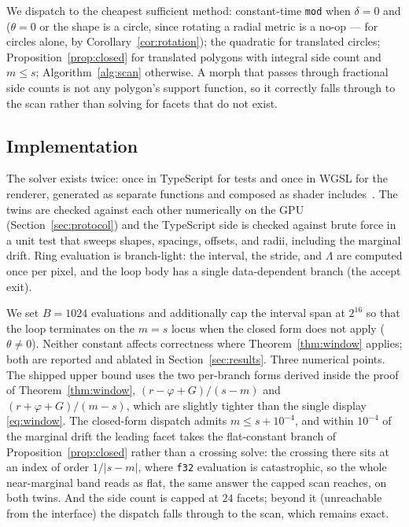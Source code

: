 We dispatch to the cheapest sufficient method: constant-time \texttt{mod} when
$\delta=0$ and ($\theta=0$ or the shape is a circle, since rotating a radial
metric is a no-op --- for circles alone, by
Corollary~\ref{cor:rotation}); the quadratic for translated circles; Proposition~\ref{prop:closed}
for translated polygons with integral side count and $m \le s$;
Algorithm~\ref{alg:scan} otherwise. A morph that passes through fractional side
counts is not any polygon's support function, so it correctly falls through to the
scan rather than solving for facets that do not exist.

\subsection{Implementation}
\label{sec:impl}

The solver exists twice: once in TypeScript for tests and once in WGSL for the
renderer, generated as separate functions and composed as shader
includes~\cite{WebGPU}. The twins are checked against each other numerically on
the GPU (Section~\ref{sec:protocol}) and the TypeScript side is checked against
brute force in a unit test that sweeps shapes, spacings, offsets, and radii,
including the marginal drift. Ring evaluation is branch-light: the interval, the
stride, and $\Lambda$ are computed once per pixel, and the loop body has a single
data-dependent branch (the accept exit).

We set $B=1024$ evaluations and additionally cap the interval span at $2^{16}$ so
that the loop terminates on the $m=s$ locus when the closed form does not apply
($\theta\neq0$). Neither constant affects correctness where
Theorem~\ref{thm:window} applies; both are reported and ablated in
Section~\ref{sec:results}. Three numerical points. The shipped upper bound uses
the two per-branch forms derived inside the proof of
Theorem~\ref{thm:window}, $(r-\varphi+G)/(s-m)$ and $(r+\varphi+G)/(m-s)$,
which are slightly tighter than the single display \eqref{eq:window}. The
closed-form dispatch admits $m \le s + 10^{-4}$, and within $10^{-4}$ of the
marginal drift the leading facet takes the flat-constant branch of
Proposition~\ref{prop:closed} rather than a crossing solve: the crossing there
sits at an index of order $1/|s-m|$, where \texttt{f32} evaluation is
catastrophic, so the whole near-marginal band reads as flat, the same answer
the capped scan reaches, on both twins. And the side count is capped at $24$
facets; beyond it (unreachable from the interface) the dispatch falls through
to the scan, which remains exact.
